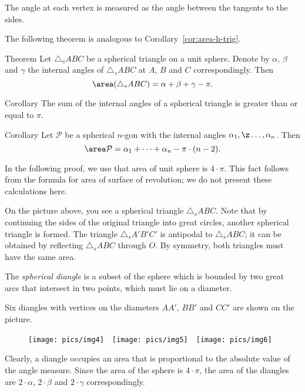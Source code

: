 The angle at each vertex is measured 
as the angle between the tangents to the sides.

The following theorem is analogous to Corollary~\ref{cor:area-h-trig}.

\begin{thm}{Theorem}\label{thm:s-trig-area}
Let $\triangle_s ABC$ be a spherical triangle on a unit sphere.
Denote by $\alpha$, $\beta$ and $\gamma$ the internal angles of $\triangle_s ABC$ 
at $A$, $B$ and $C$ correspondingly.
Then
$$\area (\triangle_s ABC) = \alpha+\beta+\gamma-\pi.$$

\end{thm}

\begin{thm}{Corollary}
The sum of the internal angles of a spherical
triangle is greater than or equal to $\pi$.
\end{thm}

\begin{thm}{Corollary}
Let $\mathcal{P}$ be a spherical $n$-gon 
with the internal angles $\alpha_1,\z\dots,\alpha_n$.
Then 
$$\area\mathcal{P}=\alpha_1+\dots+\alpha_n-\pi\cdot(n-2).$$

\end{thm}

In the following proof, we use that area of unit sphere is $4\cdot\pi$.
This fact follows from the formula for area of surface of revolution;
we do not present these calculations here.

On the picture above, you see a spherical triangle $\triangle_sABC$.
Note that by continuing the sides of the original triangle into
great circles, another spherical triangle is formed. The triangle $\triangle_sA'B'C'$
is antipodal to $\triangle_sABC$; it can be obtained by reflecting $\triangle_sABC$ through $O$. 
By symmetry, both triangles must
have the same area.

The \emph{spherical diangle} is a subset of the sphere which is bounded by two great arcs that intersect in two points, which must lie on a diameter. 

Six diangles
with vertices on the diameters $AA'$, $BB'$ and $CC'$ are shown on the picture.

\begin{figure}[h]
\texttt{[image: pics/img4]}\ \ 
\texttt{[image: pics/img5]}\ \ 
\texttt{[image: pics/img6]}
\end{figure}

Clearly, a diangle occupies an area that is proportional to the absolute value of the angle measure. 
Since the area of the sphere
is $4\cdot\pi$, 
the area of the diangles are $2\cdot\alpha$, $2\cdot\beta$ and $2\cdot\gamma$ correspondingly.

